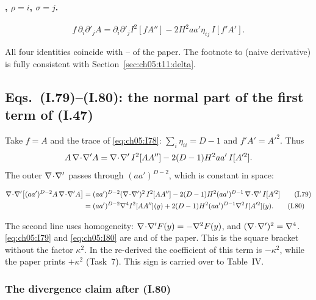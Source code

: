 \paragraph{, $\rho=i$, $\sigma=j$.}
\begin{equation}
f\,\partial_i\partial'_jA=\partial_i\partial'_jI^2[fA'']-2H^2aa'\eta_{ij}\,I[f'A'] .
\tag{I.78}\label{eq:ch05:I78}
\end{equation}

All four identities coincide with -- of the paper. The footnote to  (naive derivative) is fully consistent with Section~\ref{sec:ch05:t11:delta}.

\subsection[Eqs. (I.79)--(I.80): normal part of the first term of (I.47)]{Eqs.~(I.79)--(I.80): the normal part of the first term of (I.47) \tD}

Take $f=A$ and the trace of \eqref{eq:ch05:I78}: $\sum_i\eta_{ii}=D-1$ and $f'A'=A'^2$. Thus
\begin{equation*}
A\,\nabla\!\cdot\!\nabla' A=\nabla\!\cdot\!\nabla'\,I^2[AA'']-2(D-1)H^2aa'\,I[A'^2].
\end{equation*}
The outer $\nabla\!\cdot\!\nabla'$ passes through $(aa')^{D-2}$, which is constant in space:
\begin{resultbox}
\begin{align}
\chVdd\big[(aa')^{D-2}A\,\chVdd A\big]
&=(aa')^{D-2}(\chVdd)^2\,I^2[AA'']-2(D-1)H^2(aa')^{D-1}\,\chVdd\,I[A'^2]
\tag{I.79}\label{eq:ch05:I79}\\
&=(aa')^{D-2}\nabla^4I^2[AA''](y)+2(D-1)H^2(aa')^{D-1}\nabla^2I[A'^2](y).
\tag{I.80}\label{eq:ch05:I80}
\end{align}
\end{resultbox}
\noindent The second line uses homogeneity: $\nabla\!\cdot\!\nabla' F(y)=-\nabla^2F(y)$, and $(\nabla\!\cdot\!\nabla')^2=\nabla^4$.
\eqref{eq:ch05:I79} and \eqref{eq:ch05:I80} are  and  of the paper.
This is the square bracket without the factor $\kappa^2$.
In the re-derived  the coefficient of this term is $-\kappa^2$, while the paper prints $+\kappa^2$ (Task~7). This sign is carried over to Table~IV.

\subsubsection[The divergence claim after (I.80)]{The divergence claim after (I.80) \tC}
\label{sec:ch05:t11:power}

